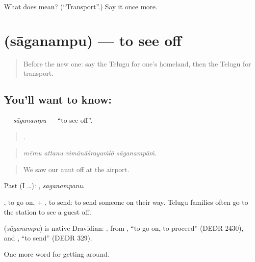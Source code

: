 \begin{tcolorbox}[breakable,colback=teal!4,colframe=teal!35!black,title={Before you move on}]
What does  mean? (\textquotedblleft{}Transport\textquotedblright{}.) Say it once more.
\end{tcolorbox}
\section[\texorpdfstring{\te{సాగనంపు} (sāganampu)}{సాగనంపు (sāganampu)}]{ (sāganampu) — to see off}

\label{lesson:TE-C454-saganampu}



\begin{quote}
Before the new one: say the Telugu for one's homeland, then the Telugu for transport.
\end{quote}

\subsection*{You'll want to know: }
\textbf{} — \emph{sāganampu} — \textquotedblleft{}to see off\textquotedblright{}.

\begin{quote}
   .
\end{quote}

\begin{quote}
\emph{mēmu attanu vimānāśrayaṁlō sāganampāṁ.}
\end{quote}

\begin{quote}
We saw our aunt off at the airport.
\end{quote}

Past (I …): , \emph{sāganampānu}.

, to go on, + , to send: to send someone on their way. Telugu families often go to the station to see a guest off.

\begin{cousinweb}
\textbf{} (\emph{sāganampu}) is native Dravidian: , from , \textquotedblleft{}to go on, to proceed\textquotedblright{} (DEDR 2430), and , \textquotedblleft{}to send\textquotedblright{} (DEDR 329).
\end{cousinweb}

\begin{grammarlens}[title={What you've built}]
One more word for getting around.
\end{grammarlens}

